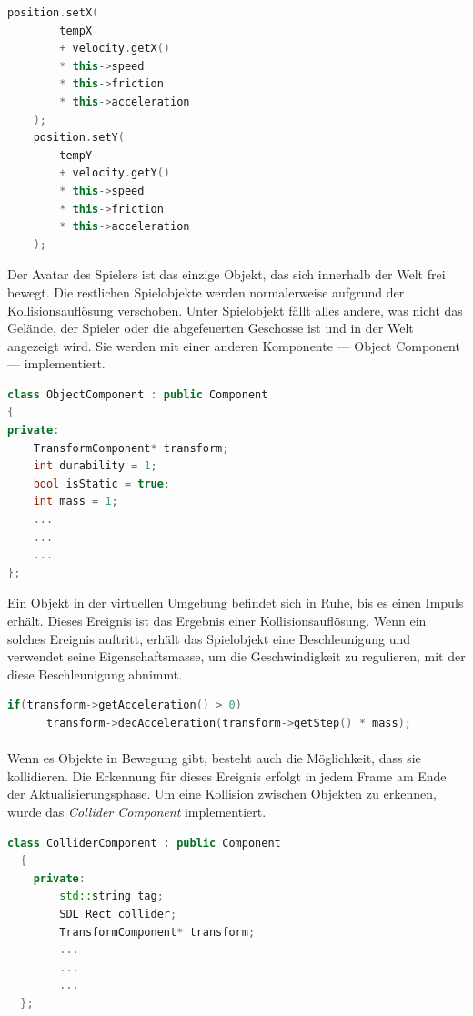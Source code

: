 \documentclass[
  10pt,
  a4paper,
  oneside,
  headers,
  headinclude,
  footinclude,
  BCOR5mm,
]{article}
\begin{document}
\begin{lstlisting}[language=C++]
    position.setX(
        tempX
        + velocity.getX()
        * this->speed
        * this->friction
        * this->acceleration
    );
    position.setY(
        tempY
        + velocity.getY()
        * this->speed
        * this->friction
        * this->acceleration
    );
\end{lstlisting}

Der Avatar des Spielers ist das einzige Objekt, das sich innerhalb der Welt frei
bewegt. Die restlichen Spielobjekte werden normalerweise aufgrund der
Kollisionsauflösung verschoben. Unter Spielobjekt fällt alles andere, was nicht
das Gelände, der Spieler oder die abgefeuerten Geschosse ist und in der Welt
angezeigt wird. Sie werden mit einer anderen Komponente --- Object Component
--- implementiert.

\begin{lstlisting}[language=C++]
class ObjectComponent : public Component
{
private:
    TransformComponent* transform;
    int durability = 1;
    bool isStatic = true;
    int mass = 1;
    ...
    ...
    ...
};
\end{lstlisting}

Ein Objekt in der virtuellen Umgebung befindet sich in Ruhe, bis es einen Impuls
erhält. Dieses Ereignis ist das Ergebnis einer Kollisionsauflösung. Wenn ein
solches Ereignis auftritt, erhält das Spielobjekt eine Beschleunigung und
verwendet seine Eigenschaftsmasse, um die Geschwindigkeit zu regulieren, mit der
diese Beschleunigung abnimmt.

\begin{lstlisting}[language=C++]
  if(transform->getAcceleration() > 0)
      transform->decAcceleration(transform->getStep() * mass);
\end{lstlisting}

\paragraph{}
Wenn es Objekte in Bewegung gibt, besteht auch die Möglichkeit, dass sie
kollidieren. Die Erkennung für dieses Ereignis erfolgt in jedem Frame am Ende
der Aktualisierungsphase. Um eine Kollision zwischen Objekten zu erkennen, wurde
das \textit{Collider Component} implementiert.

\begin{lstlisting}[language=C++]
  class ColliderComponent : public Component
  {
    private:
        std::string tag;
        SDL_Rect collider;
        TransformComponent* transform;
        ...
        ...
        ...
  };
\end{lstlisting}
\end{document}
